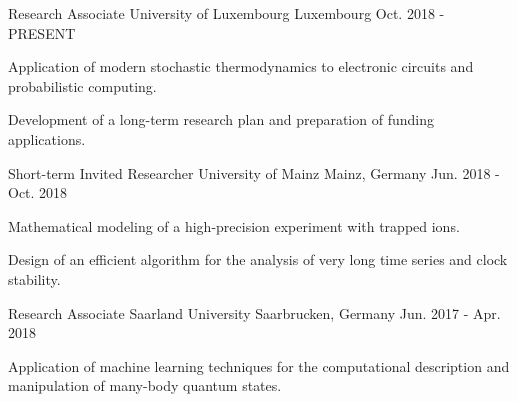 

\begin{cventries}

  \cventry
    {Research Associate} %
    {University of Luxembourg} %
    {Luxembourg} %
    {Oct. 2018 - PRESENT} %
    {
      \begin{cvitems} %
        \item {Application of modern stochastic thermodynamics to electronic circuits and probabilistic computing.}
        \item {Development of a long-term research plan and preparation of funding applications.}
      \end{cvitems}
    }

  \cventry
    {Short-term Invited Researcher} %
    {University of Mainz} %
    {Mainz, Germany} %
    {Jun. 2018 - Oct. 2018} %
    {
      \begin{cvitems} %
        \item Mathematical modeling of a high-precision experiment with trapped ions.
        \item Design of an efficient algorithm for the analysis of very long time series and clock stability.
      \end{cvitems}
    }

  \cventry
    {Research Associate} %
    {Saarland University} %
    {Saarbrucken, Germany} %
    {Jun. 2017 - Apr. 2018} %
    {
      \begin{cvitems} %
        \item Application of machine learning techniques for the computational
        description and manipulation of many-body quantum states.
      \end{cvitems}
    }


\end{cventries}

